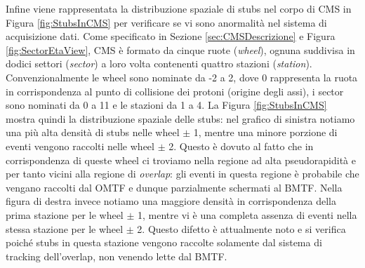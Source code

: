 Infine viene rappresentata la distribuzione spaziale di stubs nel corpo di CMS in Figura \ref{fig:StubsInCMS} per verificare se vi sono anormalità nel sistema di acquisizione dati. Come specificato in Sezione \ref{sec:CMSDescrizione} e Figura \ref{fig:SectorEtaView}, CMS è formato da cinque ruote (\textit{wheel}), ognuna suddivisa in dodici settori (\textit{sector}) a loro volta contenenti quattro stazioni (\textit{station}). Convenzionalmente le wheel sono nominate da -2 a 2, dove 0 rappresenta la ruota in corrispondenza al punto di collisione dei protoni (origine degli assi), i sector sono nominati da 0 a 11 e le stazioni da 1 a 4. La Figura \ref{fig:StubsInCMS} mostra quindi la distribuzione spaziale delle stubs: nel grafico di sinistra notiamo una più alta densità di stubs nelle wheel $\pm$ 1, mentre una minore porzione di eventi vengono raccolti nelle wheel $\pm$ 2. Questo è dovuto al fatto che in corrispondenza di queste wheel ci troviamo nella regione ad alta pseudorapidità e per tanto vicini alla regione di \textit{overlap}: gli eventi in questa regione è probabile che vengano raccolti dal OMTF e dunque parzialmente schermati al BMTF. Nella figura di destra invece notiamo una maggiore densità in corrispondenza della prima stazione per le wheel $\pm$ 1, mentre vi è una completa assenza di eventi nella stessa stazione per le wheel $\pm$ 2. Questo difetto è attualmente noto e si verifica poiché stubs in questa stazione vengono raccolte solamente dal sistema di tracking dell'overlap, non venendo lette dal BMTF.

